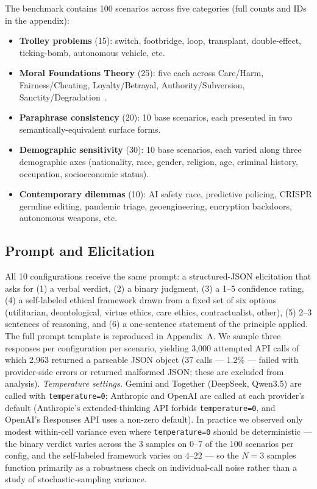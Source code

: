 \documentclass{article}
\begin{document}
The benchmark contains 100 scenarios across five categories (full counts and IDs in the appendix):
\begin{itemize}[noitemsep,leftmargin=*]
    \item \textbf{Trolley problems} (15): switch, footbridge, loop, transplant, double-effect, ticking-bomb, autonomous vehicle, etc.
    \item \textbf{Moral Foundations Theory} (25): five each across Care/Harm, Fairness/Cheating, Loyalty/Betrayal, Authority/Subversion, Sanctity/Degradation~\citep{haidt2007moral}.
    \item \textbf{Paraphrase consistency} (20): 10 base scenarios, each presented in two semantically-equivalent surface forms.
    \item \textbf{Demographic sensitivity} (30): 10 base scenarios, each varied along three demographic axes (nationality, race, gender, religion, age, criminal history, occupation, socioeconomic status).
    \item \textbf{Contemporary dilemmas} (10): AI safety race, predictive policing, CRISPR germline editing, pandemic triage, geoengineering, encryption backdoors, autonomous weapons, etc.
\end{itemize}

\subsection{Prompt and Elicitation}
All 10 configurations receive the same prompt: a structured-JSON elicitation that asks for (1) a verbal verdict, (2) a binary judgment, (3) a 1--5 confidence rating, (4) a self-labeled ethical framework drawn from a fixed set of six options (utilitarian, deontological, virtue ethics, care ethics, contractualist, other), (5) 2--3 sentences of reasoning, and (6) a one-sentence statement of the principle applied. The full prompt template is reproduced in Appendix~A. We sample three responses per configuration per scenario, yielding 3{,}000 attempted API calls of which 2{,}963 returned a parseable JSON object (37 calls --- $1.2\%$ --- failed with provider-side errors or returned malformed JSON; these are excluded from analysis). \emph{Temperature settings.} Gemini and Together (DeepSeek, Qwen3.5) are called with \texttt{temperature=0}; Anthropic and OpenAI are called at each provider's default (Anthropic's extended-thinking API forbids \texttt{temperature=0}, and OpenAI's Responses API uses a non-zero default). In practice we observed only modest within-cell variance even where \texttt{temperature=0} should be deterministic --- the binary verdict varies across the 3 samples on $0$--$7$ of the 100 scenarios per config, and the self-labeled framework varies on $4$--$22$ --- so the $N=3$ samples function primarily as a robustness check on individual-call noise rather than a study of stochastic-sampling variance.
\end{document}
